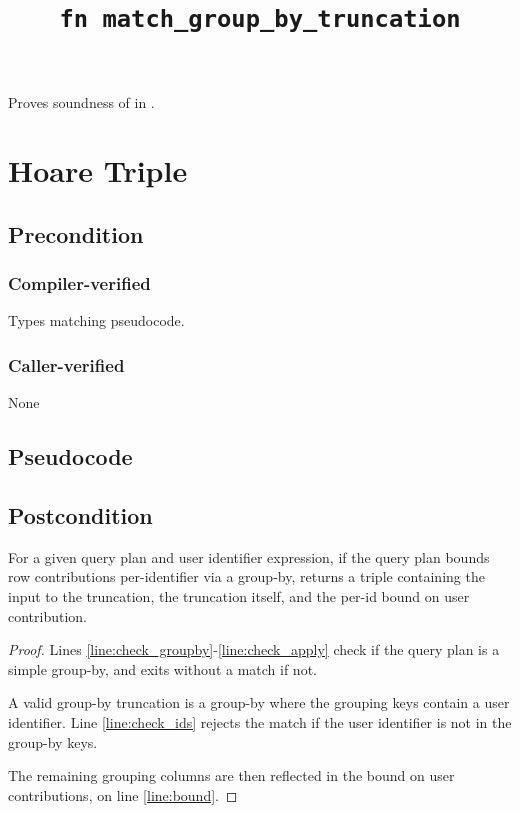 \documentclass{article}
\title{\texttt{fn match\_group\_by\_truncation}}
\author{\MichaelShoemateAuthor}
\begin{document}
\maketitle


\contrib

Proves soundness of 
in .

\section{Hoare Triple}
\subsection*{Precondition}
\subsubsection*{Compiler-verified}
Types matching pseudocode.

\subsubsection*{Caller-verified}
None

\subsection*{Pseudocode}
\label{sec:python-pseudocode}


\subsection*{Postcondition}
\begin{theorem}[Postcondition]
    For a given query plan and user identifier expression,
    if the query plan bounds row contributions per-identifier via a group-by,
    returns a triple containing the input to the truncation,
    the truncation itself, and the per-id bound on user contribution.
\end{theorem}

\begin{proof}
    Lines \ref{line:check_groupby}-\ref{line:check_apply} check if the query plan is a simple group-by,
    and exits without a match if not.

    A valid group-by truncation is a group-by where the grouping keys contain a user identifier.
    Line \ref{line:check_ids} rejects the match if the user identifier is not in the group-by keys.

    The remaining grouping columns are then reflected in the bound on user contributions,
    on line \ref{line:bound}.
\end{proof}
\end{document}
